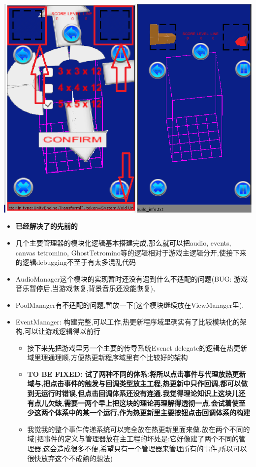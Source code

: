 \documentclass[9pt, b5paper]{article}
\begin{document}
\includegraphics[width=.9\linewidth]{./pic/readme_20221020_195727.png}
\begin{itemize}
\item \textbf{已经解决了的先前的}
\item 几个主要管理器的模块化逻辑基本搭建完成,那么就可以把audio, events, canvas tetromino, GhostTetromino等的逻辑相对于游戏主逻辑分开,使接下来的逻辑debugging不至于有太多混乱代码
\item AudioManager这个模块的实现暂时还没有遇到什么不适配的问题(BUG: 游戏音乐暂停后,当游戏恢复,背景音乐还没能恢复),
\item PoolManager有不适配的问题,暂放一下(这个模块继续放在ViewManager里).
\item EventManager: 构建完整,可以工作,热更新程序域里确实有了比较模块化的架构,可以让游戏逻辑得以前行
\begin{itemize}
\item 接下来先把游戏里另一个主要的传导系统Evenet delegate的逻辑在热更新域里理通理顺,方便热更新程序域里有个比较好的架构
\item \textbf{TO BE FIXED: 试了两种不同的体系:将所以点击事件与代理放热更新域与,把点击事件的触发与回调类型放主工程,热更新中只作回调,都可以做到无运行时错误,但点击回调体系还没有连通.我觉得理论知识上这块儿还有点儿欠缺,需要一两个早上把这块的理论再理解得透彻一点.会试着使至少这两个体系中的某一个运行,作为热更新里主要按钮点击回调体系的构建}
\item 我觉我的整个事件传递系统可以完全放在热更新里面来做.放在两个不同的域(把事件的定义与管理器放在主工程的坏处是:它好像建了两个不同的管理器,这会造成很多不便,希望只有一个管理器来管理所有的事件,所以可以很快放弃这个不成熟的想法)
\end{itemize}
\end{itemize}
\end{document}
